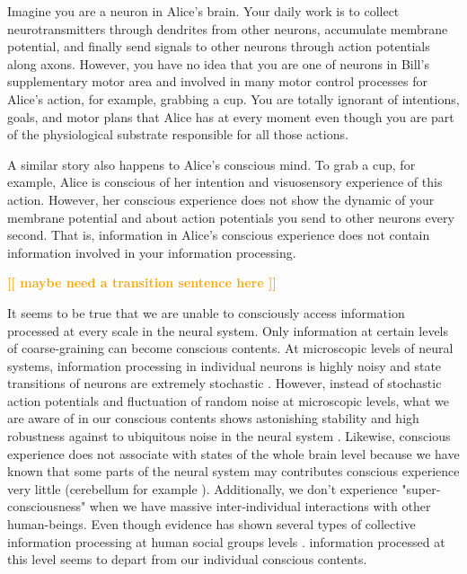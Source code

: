 \documentclass[utf8]{article}
\newcommand{\toWrite}[1]{\noindent
			\textcolor{Orange}{\textbf{[[ #1 ]]}}}
\begin{document}
		Imagine you are a neuron in Alice's brain. Your daily work is to collect neurotransmitters through dendrites from other neurons, accumulate membrane potential, and finally send signals to other neurons through action potentials along axons. However, you have no idea that you are one of neurons in Bill's supplementary motor area and involved in many motor control processes for Alice's action, for example, grabbing a cup. You are totally ignorant of intentions, goals, and motor plans that Alice has at every moment even though you are part of the physiological substrate responsible for all those actions. 
		
		A similar story also happens to Alice's conscious mind. To grab a cup, for example, Alice is conscious of her intention and visuosensory experience of this action. However, her conscious experience does not show the dynamic of your membrane potential and about action potentials you send to other neurons every second. That is, information in Alice's conscious experience does not contain information involved in your information processing. 
			
		\toWrite{maybe need a transition sentence here}
		
		It seems to be true that we are unable to consciously access information processed at every scale in the neural system. Only information at certain levels of coarse-graining can become conscious contents. At microscopic levels of neural systems, information processing in individual neurons is highly noisy and state transitions of neurons are extremely stochastic \citep{Goldwyn2011, White2000}. However, instead of stochastic action potentials and fluctuation of random noise at microscopic levels, what we are aware of in our conscious contents shows astonishing stability and high robustness against to ubiquitous noise in the neural system \citep{mathis1995computational}. Likewise, conscious experience does not associate with states of the whole brain level because we have known that some parts of the neural system may contributes conscious experience very little (cerebellum for example \citep{lemon2010life}). Additionally, we don't experience "super-consciousness" when we have massive inter-individual interactions with other human-beings. Even though evidence has shown several types of collective information processing at human social groups levels \citep{malone2015handbook}. information processed at this level seems to depart from our individual conscious contents.
		
\end{document}
